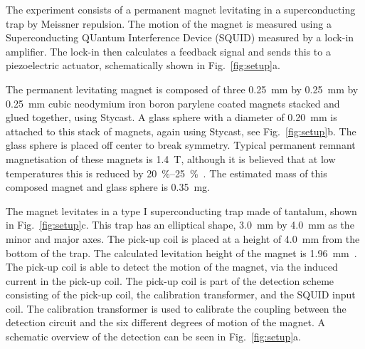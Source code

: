\label{sec:setup}
The experiment consists of a permanent magnet levitating in a superconducting trap by Meissner repulsion. The motion of the magnet is measured using a Superconducting QUantum Interference Device (SQUID) measured by a lock-in amplifier. The lock-in then calculates a feedback signal and sends this to a piezoelectric actuator, schematically shown in Fig.~\ref{fig:setup}a.



The permanent levitating magnet is composed of three \SI{0.25}{mm} by \SI{0.25}{mm} by \SI{0.25}{mm} cubic neodymium iron boron parylene coated magnets stacked and glued together, using Stycast. A glass sphere with a diameter of \SI{0.20}{mm} is attached to this stack of magnets, again using Stycast, see Fig.~\ref{fig:setup}b. The glass sphere is placed off center to break symmetry. Typical permanent remnant magnetisation of these magnets is \SI{1.4}{T}, although it is believed that at low temperatures this is reduced by \SIrange{20}{25}{\%}~\cite{NdFeB_SmCo_Technotes}. The estimated mass of this composed magnet and glass sphere is \SI{0.35}{mg}.

The magnet levitates in a type I superconducting trap made of tantalum, shown in Fig.~\ref{fig:setup}c. This trap has an elliptical shape, \SI{3.0}{mm} by \SI{4.0}{mm} as the minor and major axes. The pick-up coil is placed at a height of \SI{4.0}{mm} from the bottom of the trap. The calculated levitation height of the magnet is \SI{1.96}{mm}~\cite{Vinante2020}. The pick-up coil is able to detect the motion of the magnet, via the induced current in the pick-up coil. The pick-up coil is part of the detection scheme consisting of the pick-up coil, the calibration transformer, and the SQUID input coil. The calibration transformer is used to calibrate the coupling between the detection circuit and the six different degrees of motion of the magnet. A schematic overview of the detection can be seen in Fig.~\ref{fig:setup}a.

